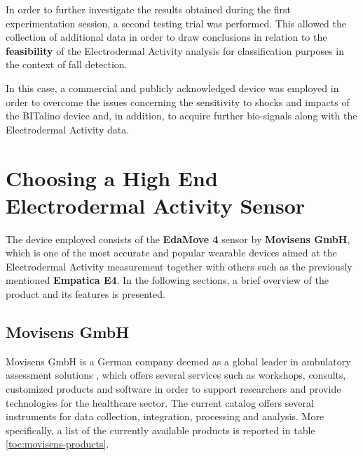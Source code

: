 \label{ch:collection}

In order to further investigate the results obtained during the first experimentation session, a second testing trial was performed. This allowed the collection of additional data in order to draw conclusions in relation to the \textbf{feasibility} of the Electrodermal Activity analysis for classification purposes in the context of fall detection.

In this case, a commercial and publicly acknowledged device was employed in order to overcome the issues concerning the sensitivity to shocks and impacts of the BITalino device and, in addition, to acquire further bio-signals along with the Electrodermal Activity data.

\section{Choosing a High End Electrodermal Activity Sensor}\label{sec:movisens}

The device employed consists of the \textbf{EdaMove 4} sensor by \textbf{Movisens GmbH}, which is one of the most accurate and popular wearable devices aimed at the Electrodermal Activity measurement together with others such as the previously mentioned \textbf{Empatica E4}. In the following sections, a brief overview of the product and its features is presented.

\subsection{Movisens GmbH}\label{subsec:movisens-company}

Movisens GmbH is a German company deemed as a global leader in ambulatory assessment solutions \cite{movisens}, which offers several services such as workshops, consults, customized products and software in order to support researchers and provide technologies for the healthcare sector.
The current catalog offers several instruments for data collection, integration, processing and analysis. More specifically, a list of the currently available products is reported in table \ref{toc:movisens-products}.

